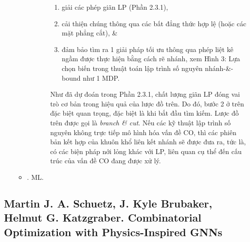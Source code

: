 \documentclass{article}
\begin{document}
\begin{itemize}
\begin{itemize}
\begin{itemize}
\begin{itemize}
                \begin{enumerate}
                    \item giải các phép giãn LP (Phần 2.3.1),
                    \item cải thiện chúng thông qua các bất đẳng thức hợp lệ (hoặc các mặt phẳng cắt), \&
                    \item đảm bảo tìm ra 1 giải pháp tối ưu thông qua phép liệt kê ngầm được thực hiện bằng cách rẽ nhánh, xem {\sf Hình 3: Lựa chọn biến trong thuật toán lập trình số nguyên nhánh-\&-bound như 1 MDP.}
                \end{enumerate}
                Như đã dự đoán trong Phần 2.3.1, chất lượng giãn LP đóng vai trò cơ bản trong hiệu quả của lược đồ trên. Do đó, bước 2 ở trên đặc biệt quan trọng, đặc biệt là khi bắt đầu tìm kiếm. Lược đồ trên được gọi là {\it branch \& cut}. Nếu các kỹ thuật lập trình số nguyên không trực tiếp mô hình hóa vấn đề CO, thì các phiên bản kết hợp của khuôn khổ liên kết nhánh sẽ được đưa ra, tức là, có các biện pháp nới lỏng khác với LP, liên quan cụ thể đến cấu trúc của vấn đề CO đang được xử lý.


            \end{itemize}
        \end{itemize}


        \item {. ML.}
    \end{itemize}
\end{itemize}



\subsection{{\sc Martin J. A. Schuetz, J. Kyle Brubaker, Helmut G. Katzgraber}. Combinatorial Optimization with Physics-Inspired GNNs}
\end{document}
